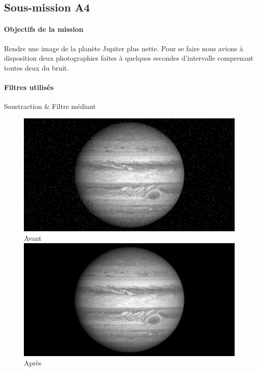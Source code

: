 	\subsection{Sous-mission A4}

	\begin{vwcol}[widths={0.65,0.2}, rule=0pt]
	\begin{minipage}{0.7\textwidth}
	\paragraph{Objectifs de la mission}

	Rendre une image de la planète Jupiter plus nette. Pour se faire nous avions à disposition deux photographies faites à quelques secondes d'intervalle comprenant toutes deux du bruit.
	\end{minipage}

	\begin{minipage}{0.3\textwidth}
	\begin{flushright}
	\paragraph{Filtres utilisés}

	Soustraction \& Filtre médiant
	\end{flushright}
	\end{minipage}

	\end{vwcol} 

	\begin{figure}[h]
	\centering
		\begin{multicols}{2}
		\includegraphics[scale=0.325]{images/Jupiter.png}
		Avant
		\includegraphics[scale=0.325]{images/JupiterAp.png}
		Après
		\end{multicols}
	\end{figure}
	\vspace{-0.9cm}

